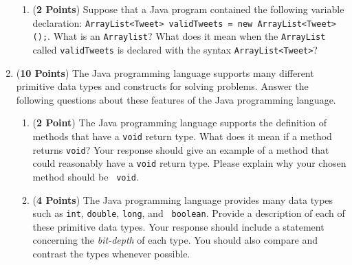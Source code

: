 \documentclass[12pt]{article}
\begin{document}
\begin{enumerate}
\begin{enumerate}

% 

\item ({\bf 2 Points}) Suppose that a Java program contained the
  following variable declaration: {\tt ArrayList<Tweet> validTweets =
    new ArrayList<Tweet>();}.  What is an {\tt Arraylist}?  What does
  it mean when the {\tt ArrayList} called {\tt validTweets} is
  declared with the syntax {\tt ArrayList<Tweet>}?

\end{enumerate}

\newpage

\item ({\bf 10 Points}) The Java programming language supports many
  different primitive data types and constructs for solving problems.
  Answer the following questions about these features of the Java
  programming language.

\begin{enumerate}

\item ({\bf 2 Point}) The Java programming language supports the
  definition of methods that have a {\tt void} return type.  What does
  it mean if a method returns {\tt void}?  Your response should give
  an example of a method that could reasonably have a {\tt void}
  return type.  Please explain why your chosen method should be {\tt
    void}.

  
\item ({\bf 4 Points}) The Java programming language provides many
  data types such as {\tt int}, {\tt double}, {\tt long}, and {\tt
    boolean}.  Provide a description of each of these primitive data
  types.  Your response should include a statement concerning the {\em
    bit-depth} of each type. You should also compare and contrast the
  types whenever possible.


\end{enumerate}
\end{enumerate}
\end{document}
